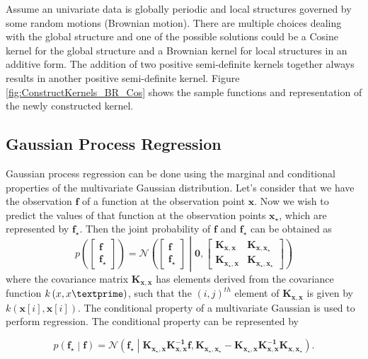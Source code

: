 Assume an univariate data is globally periodic and local structures governed by some random motions (Brownian motion). There are multiple choices dealing with the global structure and one of the possible solutions could be a Cosine kernel for the global structure and a Brownian kernel for local structures in an additive form. The addition of two positive semi-definite kernels together always results in another positive semi-definite kernel. Figure \ref{fig:ConstructKernels_BR_Cos} shows the sample functions and representation of the newly constructed kernel.

\subsection{Gaussian Process Regression}
Gaussian process regression can be done using the marginal and conditional properties of the multivariate Gaussian distribution. Let's consider that we have the observation $\mathbf{f}$ of a function at the observation point $\mathbf{x}$. Now we wish to predict the values of that function at the observation points $\mathbf{x_\star}$, which are represented by $\mathbf{f_\star}$. Then the joint probability of $\mathbf{f}$ and $\mathbf{f_\star}$ can be obtained as 
\begin{equation} \label{eq:jointPro_f_f*}
p \left( \begin{bmatrix} \mathbf{f} \\\mathbf{f_\star} \end{bmatrix} \right) =
\mathcal{N}\left( \begin{bmatrix} \mathbf{f} \\\mathbf{f_\star} \end{bmatrix} \middle|
\mathbf{0}, \begin{bmatrix} \mathbf{K_{x,x}} & \mathbf{K_{x,x_\star}} \\
\mathbf{K_{x_\star,x}} & \mathbf{K_{x_\star,x_\star}} \end{bmatrix} \right)
\end{equation}
where the covariance matrix $ \mathbf{K_{x,x}}$ has elements derived from the covariance function $ k \left(x,x\textprime \right)$, such that the $ \left(i,j \right)^{th}$ element of $\mathbf{K_{x,x}}$ is given by $k \left( \mathbf{x} \left[ i\right],\mathbf{x} \left[ i\right] \right)$. The conditional property of a multivariate Gaussian is used to perform regression. The conditional property can be represented by

\begin{equation} \label{eq:condProMvG}
p \left( \mathbf{f_\star} \middle| \mathbf{f} \right) =
\mathcal{N}\left( \mathbf{f_\star} \middle| \mathbf{K_{x_\star,x}}  \mathbf{K^{-1}_{x,x}} \mathbf{f,} \mathbf{K_{x_\star,x_\star}} - 
\mathbf{K_{x_\star,x}} \mathbf{K^{-1}_{x,x}} \mathbf{K_{x,x_\star}}\right).
\end{equation}

